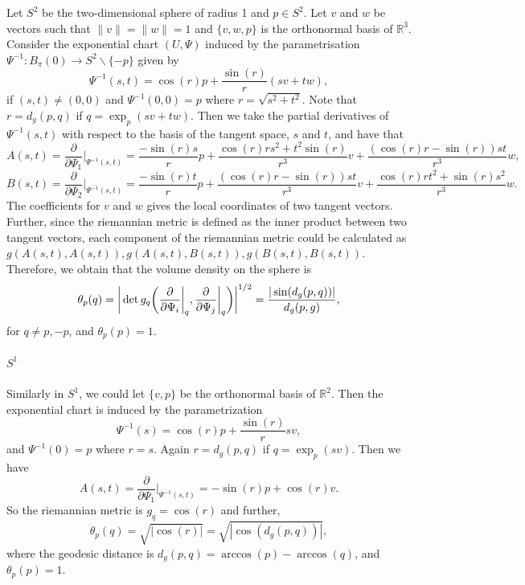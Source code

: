 \documentclass[11pt,a4paper,]{article}
\begin{document}
Let \(S^2\) be the two-dimensional sphere of radius 1 and \(p \in S^2\). Let \(v\) and \(w\) be vectors such that \(\|v\| = \|w\| = 1\) and \(\{v, w, p\}\) is the orthonormal basis of \(\mathbb{R}^3\). Consider the exponential chart \((U, \Psi)\) induced by the parametrisation \(\Psi^{-1}: B_\pi(0) \rightarrow S^2 \backslash \{-p\}\) given by
\[
\Psi^{-1}(s,t) = \cos(r)p + \frac{\sin(r)}{r}(sv+tw),
\]
if \((s,t) \neq (0,0)\) and \(\Psi^{-1}(0,0)=p\) where \(r=\sqrt{s^2 + t^2}\).
Note that \(r=d_g(p,q)\) if \(q = \exp_p(sv+tw)\).
Then we take the partial derivatives of \(\Psi^{-1}(s,t)\) with respect to the basis of the tangent space, \(s\) and \(t\), and have that
\[
A(s,t) = \frac{\partial}{\partial \Psi_1} \bigg|_{\Psi^{-1}(s,t)} = \frac{-\sin{(r)}s}{r}p + \frac{\cos(r)rs^2+t^2\sin(r)}{r^3}v + \frac{(\cos(r)r-\sin(r))st}{r^3}w,
\]
\[
B(s,t) = \frac{\partial}{\partial \Psi_2} \bigg|_{\Psi^{-1}(s,t)} = \frac{-\sin{(r)}t}{r}p + \frac{(\cos(r)r-\sin(r))st}{r^3}v + \frac{\cos(r)rt^2+\sin(r)s^2}{r^3}w.
\]
The coefficients for \(v\) and \(w\) gives the local coordinates of two tangent vectors.
Further, since the riemannian metric is defined as the inner product between two tangent vectors, each component of the riemannian metric could be calculated as \(g(A(s,t), A(s,t)), g(A(s,t), B(s,t)), g(B(s,t), B(s,t))\).
Therefore, we obtain that the volume density on the sphere is
\[
\theta_p(q) = \bigg| \det g_q\bigg( \frac{\partial}{\partial \Psi_i}\bigg|_q, \frac{\partial}{\partial \Psi_j}\bigg|_q \bigg) \bigg|^{1/2} \\
= \frac{|\sin(d_g(p,q))|}{d_g(p,g)},
\]
for \(q \neq p, -p\), and \(\theta_p(p) = 1\).

\hypertarget{s1}{%
\paragraph{\texorpdfstring{\(S^1\)}{S\^{}1}}\label{s1}}

Similarly in \(S^1\), we could let \(\{v, p\}\) be the orthonormal basis of \(\mathbb{R}^2\). Then the exponential chart is induced by the parametrization
\[
\Psi^{-1}(s) = \cos(r)p + \frac{\sin(r)}{r}sv,
\]
and \(\Psi^{-1}(0) = p\) where \(r = s\). Again \(r = d_g(p,q)\) if \(q = \exp_p(sv)\). Then we have
\[
A(s,t) = \frac{\partial}{\partial \Psi_1} \bigg|_{\Psi^{-1}(s,t)} = - \sin(r)p + \cos(r)v.
\]
So the riemannian metric is \(g_q = \cos(r)\) and further,
\[
\theta_p(q) = \sqrt{|\cos(r)|} = \sqrt{|\cos(d_g(p,q))|},
\]
where the geodesic distance is \(d_g(p,q) = \arccos(p) - \arccos(q)\), and \(\theta_p(p) = 1\).
\end{document}
